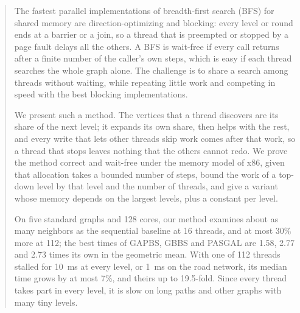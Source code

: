 \begin{abstract}
The fastest parallel implementations of breadth-first search (BFS) for shared memory are direction-optimizing and blocking: every level or round ends at a barrier or a join, so a thread that is preempted or stopped by a page fault delays all the others. A BFS is wait-free if every call returns after a finite number of the caller's own steps, which is easy if each thread searches the whole graph alone. The challenge is to share a search among threads without waiting, while repeating little work and competing in speed with the best blocking implementations.

We present such a method. The vertices that a thread discovers are its share of the next level; it expands its own share, then helps with the rest, and every write that lets other threads skip work comes after that work, so a thread that stops leaves nothing that the others cannot redo. We prove the method correct and wait-free under the memory model of x86, given that allocation takes a bounded number of steps, bound the work of a top-down level by that level and the number of threads, and give a variant whose memory depends on the largest levels, plus a constant per level.

On five standard graphs and 128 cores, our method examines about as many neighbors as the sequential baseline at 16 threads, and at most 30\% more at 112; the best times of GAPBS, GBBS and PASGAL are 1.58, 2.77 and 2.73 times its own in the geometric mean. With one of 112 threads stalled for 10~ms at every level, or 1~ms on the road network, its median time grows by at most 7\%, and theirs up to 19.5-fold. Since every thread takes part in every level, it is slow on long paths and other graphs with many tiny levels.
\end{abstract}
